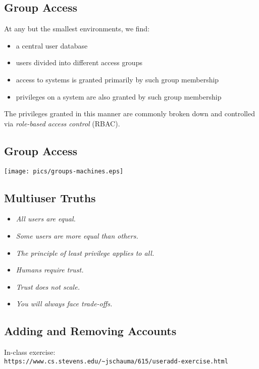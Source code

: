 \documentclass[xga]{xdvislides}
\begin{document}
\subsection{Group Access}
At any but the smallest environments, we find:
\begin{itemize}
	\item a central user database
	\item users divided into different access groups
	\item access to systems is granted primarily by such group membership
	\item privileges on a system are also granted by such group membership
\end{itemize}
\vspace{.5in}
The privileges granted in this manner are commonly
broken down and controlled via {\em role-based access
control} (RBAC).

\subsection{Group Access}
\begin{center}
	\texttt{[image: pics/groups-machines.eps]}
\end{center}

\subsection{Multiuser Truths}
\begin{itemize}
	\item {\em All users are equal.}
	\item {\em Some users are more equal than others.}
	\item {\em The principle of least privilege applies to all.}
	\item {\em Humans require trust.}
	\item {\em Trust does not scale.}
	\item {\em You will always face trade-offs.}
\end{itemize}


\subsection{Adding and Removing Accounts}

\vfill
In-class exercise: \\
\verb+https://www.cs.stevens.edu/~jschauma/615/useradd-exercise.html+
\vfill
\end{document}
